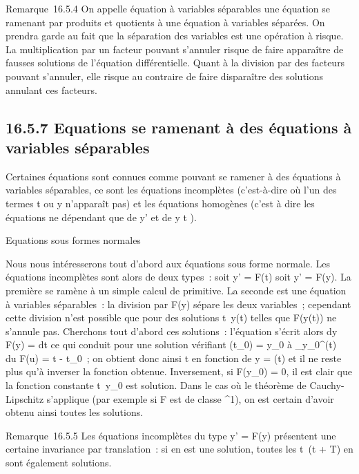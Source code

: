Remarque~16.5.4 On appelle équation à variables séparables une équation
se ramenant par produits et quotients à une équation à variables
séparées. On prendra garde au fait que la séparation des variables est
une opération à risque. La multiplication par un facteur pouvant
s'annuler risque de faire apparaître de fausses solutions de l'équation
différentielle. Quant à la division par des facteurs pouvant s'annuler,
elle risque au contraire de faire disparaître des solutions annulant ces
facteurs.

\subsection{16.5.7 Equations se ramenant à des équations à variables
séparables}

Certaines équations sont connues comme pouvant se ramener à des
équations à variables séparables, ce sont les équations incomplètes
(c'est-à-dire où l'un des termes t ou y n'apparaît pas) et les équations
homogènes (c'est à dire les équations ne dépendant que de y' et de  y
\over t ).

Equations sous formes normales

Nous nous intéresserons tout d'abord aux équations sous forme normale.
Les équations incomplètes sont alors de deux types~: soit y' = F(t) soit
y' = F(y). La première se ramène à un simple calcul de primitive. La
seconde est une équation à variables séparables~: la division par F(y)
sépare les deux variables~; cependant cette division n'est possible que
pour des solutions t\mapsto~y(t) telles que F(y(t))
ne s'annule pas. Cherchons tout d'abord ces solutions~: l'équation
s'écrit alors  dy \over F(y) = dt ce qui conduit pour
une solution vérifiant \phi(t_0) = y_0 à
\int  _y_0^\phi(t)~ du
\over F(u) = t - t_0~; on obtient donc ainsi t
en fonction de y = \phi(t) et il ne reste plus qu'à inverser la fonction
obtenue. Inversement, si F(y_0) = 0, il est clair que la
fonction constante t\mapsto~y_0 est
solution. Dans le cas où le théorème de Cauchy-Lipschitz s'applique (par
exemple si F est de classe ^1), on est certain d'avoir
obtenu ainsi toutes les solutions.

Remarque~16.5.5 Les équations incomplètes du type y' = F(y) présentent
une certaine invariance par translation~: si \phi en est une solution,
toutes les t\mapsto~\phi(t + T) en sont également
solutions.


